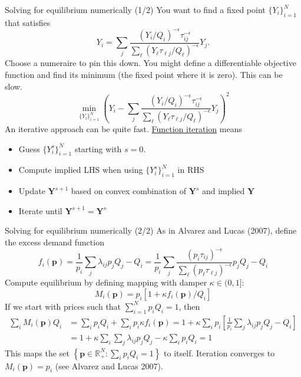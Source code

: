 \documentclass[10pt,notes=hide,aspectratio=169]{beamer}
\begin{document}
\begin{frame}{Solving for equilibrium numerically (1/2)}
You want to find a fixed point $\{Y_i\}_{i=1}^{N}$ that satisfies
$$
Y_i
=
\sum_j \frac{\left(Y_i/Q_i\right)^{-\epsilon} \tau_{ij}^{-\epsilon}}{\sum_{\ell} \left(Y_{\ell} \tau_{\ell j} / Q_{\ell}\right)^{-\epsilon}} Y_j
.$$
Choose a numeraire to pin this down.
You might define a differentiable objective function and find its minimum (the fixed point where it is zero).
This can be slow.
$$
\min_{\{Y_{i}\}_{i=1}^{N}}
\left(Y_i
-
\sum_j \frac{\left(Y_i/Q_i\right)^{-\epsilon} \tau_{ij}^{-\epsilon}}{\sum_{\ell} \left(Y_{\ell} \tau_{\ell j} / Q_{\ell}\right)^{-\epsilon}} Y_j
\right)^2
$$
An iterative approach can be quite fast. \href{https://raw.githack.com/AEM7130/class-repo/master/lecture-notes/04-optimization/04-optimization.html\#40}{Function iteration} means
\begin{itemize}
\item Guess $\{Y_{i}^{s}\}_{i=1}^{N}$ starting with $s=0$.
\item Compute implied LHS when using $\{Y_{i}^{s}\}_{i=1}^{N}$ in RHS
\item Update $\mathbf{Y}^{s+1}$ based on convex combination of $\mathbf{Y}^{s}$ and implied $\mathbf{Y}$
\item Iterate until $\mathbf{Y}^{s+1} = \mathbf{Y}^{s}$
\end{itemize}
\end{frame}
\begin{frame}{Solving for equilibrium numerically (2/2)}
As in Alvarez and Lucas (2007), define the excess demand function
$$
f_i(\mathbf{p}) 
=
\frac{1}{p_i} \sum_{j} \lambda_{ij} p_j Q_j - Q_i
=
\frac{1}{p_i} \sum_{j}
\frac{\left(p_i\tau_{ij}\right)^{-\epsilon}}{\sum_{\ell} \left(p_{\ell} \tau_{\ell j}\right)^{-\epsilon}}
p_j Q_j - Q_i
$$
Compute equilibrium by defining mapping with damper $\kappa \in (0,1]$:
$$M_i(\mathbf{p}) = p_i \left[1 + \kappa f_i(\mathbf{p}) / Q_{i}\right]$$
If we start with prices such that $\sum_{i=1}^{N} p_i Q_i = 1$, then
\begin{align*}
\sum_{i} M_i(\mathbf{p}) Q_i
&=
\sum_{i} p_i Q_i + \sum_{i} p_i \kappa f_i(\mathbf{p})
=
1 + \kappa \sum_{i} p_i \left[\frac{1}{p_i} \sum_{j} \lambda_{ij} p_j Q_j - Q_i\right]
\\
&=
1 + \kappa \sum_{i} \sum_{j} \lambda_{ij} p_j Q_j - \kappa \sum_{i} p_i  Q_i
=
1
\end{align*}
This maps the set $\left\{\mathbf{p} \in \mathbb{R}^{N}_{+}: \sum_{i} p_i Q_i = 1\right\}$ to itself.
Iteration converges to $M_{i}(\mathbf{p}) = p_i$ (see Alvarez and Lucas 2007).
\end{frame}
\end{document}
